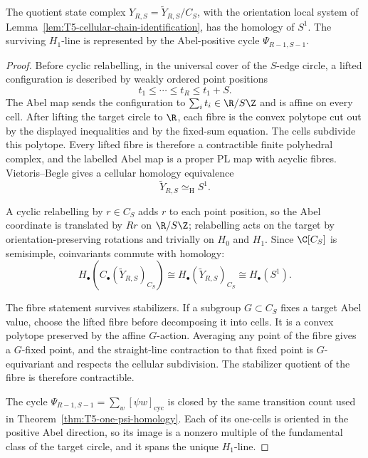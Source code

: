 \begin{lem}\label{lem:T5-abel-cyclic-stabilizers}
  The quotient state complex
  \(Y_{R,S}=\widetilde Y_{R,S}/C_S\), with the orientation local system
  of Lemma~\ref{lem:T5-cellular-chain-identification}, has the homology
  of \(S^1\).  The surviving \(H_1\)-line is represented by the
  Abel-positive cycle \(\Psi_{R-1,S-1}\).
\end{lem}

\begin{proof}
  Before cyclic relabelling, in the universal cover of the
  \(S\)-edge circle, a lifted configuration is described by weakly
  ordered point positions
  \[
    t_1\leq\cdots\leq t_R\leq t_1+S.
  \]
  The Abel map sends the configuration to
  \(\sum_i t_i\in\R/S\Z\) and is affine on every cell.  After lifting the
  target circle to \(\R\), each fibre is the convex polytope cut out by
  the displayed inequalities and by the fixed-sum equation.  The
  cells subdivide this polytope.  Every lifted fibre is
  therefore a contractible finite polyhedral complex, and the labelled
  Abel map is a proper PL map with acyclic fibres.  Vietoris--Begle
  gives a cellular homology equivalence
  \[
    \widetilde Y_{R,S}\simeq_{\mathrm H} S^1 .
  \]

  A cyclic relabelling by \(r\in C_S\) adds \(r\) to each point position,
  so the Abel coordinate is translated by \(Rr\) on \(\R/S\Z\);
  relabelling acts on the target by orientation-preserving rotations and
  trivially on \(H_0\) and \(H_1\).  Since \(\C[C_S]\) is
  semisimple, coinvariants commute with homology:
  \[
    H_\bullet(C_\bullet(\widetilde Y_{R,S})_{C_S})
      \cong H_\bullet(\widetilde Y_{R,S})_{C_S}
      \cong H_\bullet(S^1).
  \]

  The fibre statement survives stabilizers.  If a subgroup \(G\subset C_S\)
  fixes a target Abel value, choose the lifted fibre before decomposing it
	  into cells.  It is a convex polytope preserved by the affine
  \(G\)-action.  Averaging any point of the fibre gives a \(G\)-fixed point,
  and the straight-line contraction to that fixed point is \(G\)-equivariant
	  and respects the cellular subdivision.  The stabilizer quotient of the
  fibre is therefore contractible.

  The cycle \(\Psi_{R-1,S-1}=\sum_w[\psi w]_{\mathrm{cyc}}\) is closed by
  the same transition count used in
  Theorem~\ref{thm:T5-one-psi-homology}.  Each of its one-cells is
  oriented in the positive Abel direction, so its image is a nonzero
  multiple of the fundamental class of the target circle, and it spans
  the unique \(H_1\)-line.
\end{proof}

